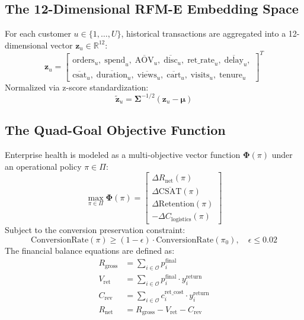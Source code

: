 \documentclass[conference]{IEEEtran}
\begin{document}
\subsection{The 12-Dimensional RFM-E Embedding Space}
For each customer $u \in \{1, \dots, U\}$, historical transactions are aggregated into a 12-dimensional vector $\mathbf{z}_u \in \mathbb{R}^{12}$:
\begin{equation}
\mathbf{z}_u = \begin{bmatrix}
\text{orders}_u, \; \text{spend}_u, \; \overline{\text{AOV}}_u, \; \overline{\text{disc}}_u, \; \text{ret\_rate}_u, \; \overline{\text{delay}}_u, \\
\overline{\text{csat}}_u, \; \overline{\text{duration}}_u, \; \overline{\text{views}}_u, \; \overline{\text{cart}}_u, \; \text{visits}_u, \; \text{tenure}_u
\end{bmatrix}^T
\end{equation}
Normalized via z-score standardization:
\begin{equation}
\tilde{\mathbf{z}}_u = \mathbf{\Sigma}^{-1/2} (\mathbf{z}_u - \mathbf{\mu})
\end{equation}

\subsection{The Quad-Goal Objective Function}
Enterprise health is modeled as a multi-objective vector function $\mathbf{\Phi}(\pi)$ under an operational policy $\pi \in \Pi$:
\begin{equation}
\max_{\pi \in \Pi} \mathbf{\Phi}(\pi) = \begin{bmatrix}
\Delta R_{\text{net}}(\pi) \\
\Delta \overline{\text{CSAT}}(\pi) \\
\Delta \text{Retention}(\pi) \\
-\Delta C_{\text{logistics}}(\pi)
\end{bmatrix}
\end{equation}
Subject to the conversion preservation constraint:
\begin{equation}
\text{ConversionRate}(\pi) \ge (1 - \epsilon) \cdot \text{ConversionRate}(\pi_0), \quad \epsilon \le 0.02
\end{equation}
The financial balance equations are defined as:
\begin{align}
R_{\text{gross}} &= \sum_{i \in \mathcal{O}} p_i^{\text{final}} \\
V_{\text{ret}} &= \sum_{i \in \mathcal{O}} p_i^{\text{final}} \cdot y_i^{\text{return}} \\
C_{\text{rev}} &= \sum_{i \in \mathcal{O}} c_i^{\text{ret\_cost}} \cdot y_i^{\text{return}} \\
R_{\text{net}} &= R_{\text{gross}} - V_{\text{ret}} - C_{\text{rev}}
\end{align}
\end{document}
